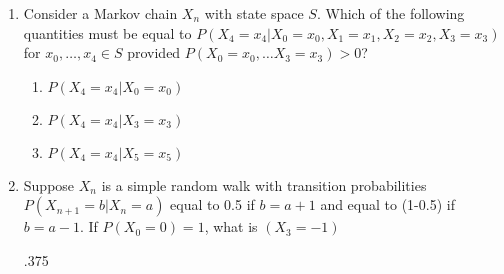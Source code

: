 \documentclass[10pt]{article}
\begin{document}
\begin{enumerate}
\newpage

  \item Consider a Markov chain $X_n$ with state space $S$.  Which of the
    following quantities must be equal to $P(X_4 = x_4 | X_0 = x_0, X_1 = 
    x_1, X_2 = x_2, X_3 = x_3)$ for $x_0, \dots, x_4 \in S$ provided
    $P(X_0=x_0, \dots X_3 = x_3) > 0$?
    \begin{enumerate}
      \item $P(X_4 = x_4 | X_0 = x_0)$
      \item $P(X_4 = x_4 | X_3 = x_3)$ \checkmark
      \item $P(X_4 = x_4 | X_5 = x_5)$
    \end{enumerate}

\newpage

  \item Suppose $X_n$ is a simple random walk with transition
    probabilities $P(X_{n+1} = b|X_n = a)$ equal to 0.5 if $b=a+1$ and
    equal to (1-0.5) if $b=a-1$.  If $P(X_0=0)=1$, what is $(X_3=-1)$

    .375

\end{enumerate}
\end{document}
